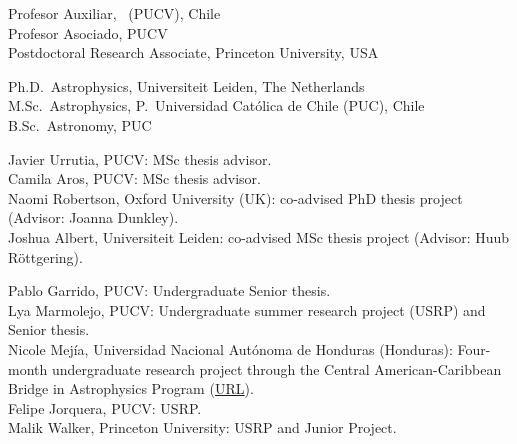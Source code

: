 \documentclass[11pt]{article}
\begin{document}

\noindent
{} Profesor Auxiliar, \pucv\ (PUCV), Chile\\
 Profesor Asociado, PUCV\\
 Postdoctoral Research Associate, Princeton University, USA



\noindent
{} Ph.D.~Astrophysics, Universiteit Leiden, The Netherlands\\
 M.Sc.~Astrophysics, P.~Universidad Cat\'olica de Chile (PUC), Chile\\
 B.Sc.~Astronomy, PUC\\







\noindent
{} Javier Urrutia, PUCV: MSc thesis advisor.\\
 Camila Aros, PUCV: MSc thesis advisor.\\
 Naomi Robertson, Oxford University (UK): co-advised PhD thesis project (Advisor: Joanna Dunkley).\\
 Joshua Albert, Universiteit Leiden: co-advised MSc thesis project (Advisor: Huub R\"ottgering). 


\noindent
{} Pablo Garrido, PUCV: Undergraduate Senior thesis.\\
 Lya Marmolejo, PUCV: Undergraduate summer research project (USRP) and Senior thesis.\\
 Nicole Mej\'ia, Universidad Nacional Aut\'onoma de Honduras (Honduras): Four-month undergraduate
    research project through the Central American-Caribbean Bridge in Astrophysics Program
    (\href{https://cencabridgeastro.weebly.com/our-team.html}{URL}).\\
 Felipe Jorquera, PUCV: USRP.\\
 Malik Walker, Princeton University: USRP and Junior Project.\\
\end{document}
